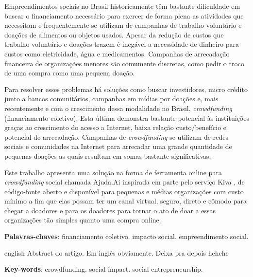\begin{resumo}
Empreendimentos sociais no Brasil historicamente têm bastante dificuldade em buscar o financiamento necessário para exercer de forma plena as atividades que necessitam e frequentemente se utilizam de campanhas de trabalho voluntário e doações de alimentos ou objetos usados. Apesar da redução de custos que trabalho voluntário e doações trazem é inegável a necessidade de dinheiro para custos como eletricidade, água e medicamentos. Campanhas de arrecadação financeira de organizações menores são comumente discretas, como pedir o troco de uma compra como uma pequena doação.

Para resolver esses problemas há soluções como buscar investidores, micro crédito junto a bancos comunitários, campanhas em mídias por doações e, mais recentemente e com o crescimento dessa modalidade no Brasil, \emph{crowdfunding} (financiamento coletivo). Esta última demonstra bastante potencial às instituições graças ao crescimento do acesso a Internet, baixa relação custo/benefício e potencial de arrecadação. Campanhas de \emph{crowdfunding} se utilizam de redes sociais e comunidades na Internet para arrecadar uma grande quantidade de pequenas doações as quais resultam em somas bastante significativas.

Este trabalho apresenta uma solução na forma de ferramenta online para \emph{crowdfunding} social chamada Ajuda.Ai inspirada em parte pelo serviço Kiva \cite{flannery2007kiva}, de código-fonte aberto e disponível para pequenas e médias organizações com custo mínimo a fim que elas possam ter um canal virtual, seguro, direto e cômodo para chegar a doadores e para os doadores para tornar o ato de doar a essas organizações tão simples quanto uma compra online.

  \vspace{\onelineskip}
  \noindent
  \textbf{Palavras-chaves}: financiamento coletivo. impacto social. empreendimento social.
\end{resumo}

\begin{resumo}[Abstract]
	\begin{otherlanguage*}{english}
		Abstract do artigo. Em inglês obviamente. Deixa pra depois hehehe
        
		\vspace{\onelineskip}
		\noindent
		\textbf{Key-words}: crowdfunding. social impact. social entrepreneurship.
	\end{otherlanguage*}
\end{resumo}